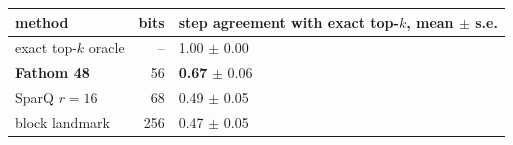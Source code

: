 \begin{tabular}{lrl}
\toprule
method & bits & step agreement with exact top-$k$, mean $\pm$ s.e. \\
\midrule
exact top-$k$ oracle & -- & 1.00 $\pm$ 0.00 \\
\textbf{Fathom 48} & 56 & \textbf{0.67} $\pm$ 0.06 \\
SparQ $r{=}16$ & 68 & 0.49 $\pm$ 0.05 \\
block landmark & 256 & 0.47 $\pm$ 0.05 \\
\bottomrule
\end{tabular}